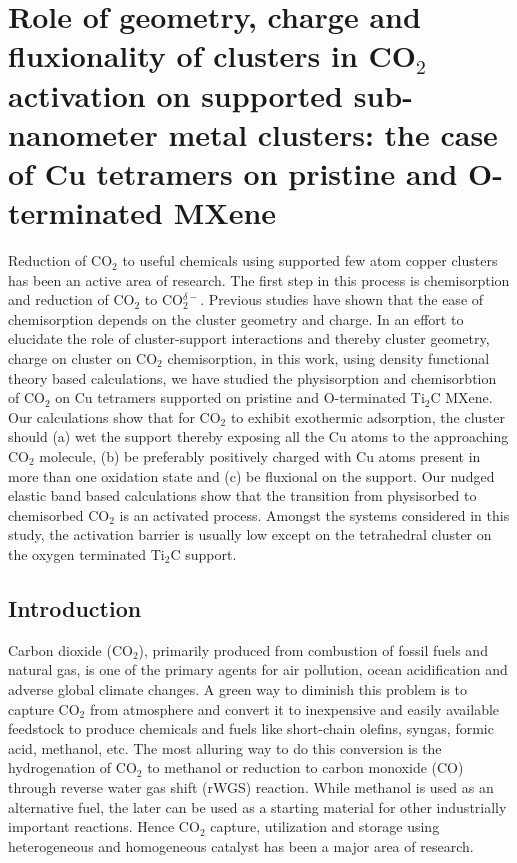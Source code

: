 \chapter{Role of geometry, charge and fluxionality of clusters in CO\texorpdfstring{$_2$}{} activation on supported sub-nanometer metal clusters: the case of Cu tetramers on pristine and O-terminated MXene}\label{appendix2}


Reduction of CO$_2$ to useful chemicals using supported few atom copper clusters has been an active area of research. The first step in this process is chemisorption and reduction of CO$_2$ to CO$_2^{\delta-}$. Previous studies have shown that the ease of chemisorption depends on the cluster geometry and charge. In an effort to elucidate the role of cluster-support interactions and thereby cluster geometry, charge on cluster on CO$_2$ chemisorption, in this work, using density functional theory based calculations, we have studied the physisorption and chemisorbtion of CO$_2$ on Cu tetramers supported on pristine and O-terminated Ti$_2$C MXene. Our calculations show that for CO$_2$ to exhibit exothermic adsorption, the cluster should (a) wet the support thereby exposing all the Cu atoms to the  approaching CO$_2$ molecule, (b) be preferably positively charged with Cu atoms present in more than one oxidation state and (c) be fluxional on the support. Our nudged elastic band based calculations show that the transition from physisorbed to chemisorbed CO$_2$ is an activated process. Amongst the systems considered in this study, the activation barrier is usually low except on the tetrahedral cluster on the oxygen terminated Ti$_2$C support.



\section{Introduction}

 Carbon dioxide (CO$_2$), primarily produced from combustion of fossil fuels and natural
 gas, is one of the primary agents for air pollution, ocean acidification\cite{cc} and
 adverse global climate changes\cite{climate}. A green way to diminish this problem is
 to capture CO$_2$ from atmosphere and convert it to inexpensive and easily available
 feedstock to produce chemicals and fuels like short-chain olefins, syngas, formic acid,
 methanol, etc\cite{dorner, javier}. The most alluring way to do this conversion is the 
 hydrogenation of CO$_2$ to methanol\cite{hydrogenation1, hydrogenation2} or reduction to 
 carbon monoxide (CO) through reverse water gas shift (rWGS) reaction\cite{rwgs}. While methanol is used as an alternative
 fuel, the later can
 be used as a starting material for other industrially important reactions. Hence CO$_2$ capture,
 utilization and storage using heterogeneous and homogeneous catalyst has been a major
 area of research.
 
